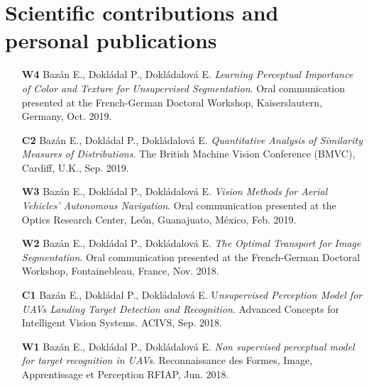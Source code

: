 
\chapter*{Scientific contributions and personal publications}\label{ch:publications}

\begin{itemize}
    \item [\textbf{W4}] Bazán E., Dokládal P., Dokládalová E. \textit{Learning Perceptual Importance of Color and Texture for Unsupervised Segmentation}. Oral communication presented at the French-German Doctoral Workshop, Kaiserslautern, Germany, Oct. 2019.
    \item [\textbf{C2}] Bazán E., Dokládal P., Dokládalová E. \textit{Quantitative Analysis of Similarity Measures of Distributions}. The British Machine Vision Conference (BMVC), Cardiff, U.K., Sep. 2019.
    \item [\textbf{W3}] Bazán E., Dokládal P., Dokládalová E. \textit{Vision Methods for Aerial Vehicles’ Autonomous Navigation}. Oral communication presented at the Optics Research Center, León, Guanajuato, México, Feb. 2019.
    \item [\textbf{W2}] Bazán E., Dokládal P., Dokládalová E. \textit{The Optimal Transport for Image Segmentation}. Oral communication presented at the French-German Doctoral Workshop, Fontainebleau, France, Nov. 2018.
    \item [\textbf{C1}] Bazán E., Dokládal P., Dokládalová E. U\textit{nsupervised Perception Model for UAVs Landing Target Detection and Recognition}. Advanced Concepts for Intelligent Vision Systems. ACIVS,  Sep. 2018.
    \item [\textbf{W1}] Bazán E., Dokládal P., Dokládalová E. \textit{Non supervised perceptual model for target recognition in UAVs}. Reconnaissance des Formes, Image, Apprentissage et Perception RFIAP, Jun. 2018.
\end{itemize}
